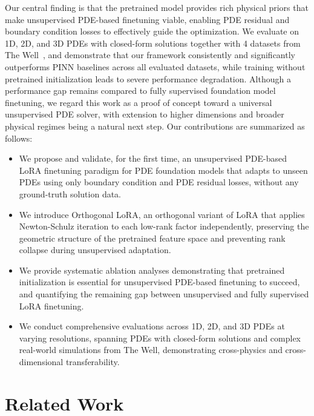 \documentclass{article}
\begin{document}
Our central finding is that the pretrained model provides rich physical priors that make unsupervised PDE-based finetuning viable, enabling PDE residual and boundary condition losses to effectively guide the optimization. We evaluate on 1D, 2D, and 3D PDEs with closed-form solutions together with 4 datasets from The Well~\cite{ohana2024thewell}, and demonstrate that our framework consistently and significantly outperforms PINN baselines across all evaluated datasets, while training without pretrained initialization leads to severe performance degradation. Although a performance gap remains compared to fully supervised foundation model finetuning, we regard this work as a proof of concept toward a universal unsupervised PDE solver, with extension to higher dimensions and broader physical regimes being a natural next step. Our contributions are summarized as follows:
\begin{itemize}
    \item We propose and validate, for the first time, an unsupervised PDE-based LoRA finetuning paradigm for PDE foundation models that adapts to unseen PDEs using only boundary condition and PDE residual losses, without any ground-truth solution data.
    \item We introduce Orthogonal LoRA, an orthogonal variant of LoRA that applies Newton-Schulz iteration to each low-rank factor independently, preserving the geometric structure of the pretrained feature space and preventing rank collapse during unsupervised adaptation.
    \item We provide systematic ablation analyses demonstrating that pretrained initialization is essential for unsupervised PDE-based finetuning to succeed, and quantifying the remaining gap between unsupervised and fully supervised LoRA finetuning.
    \item We conduct comprehensive evaluations across 1D, 2D, and 3D PDEs at varying resolutions, spanning PDEs with closed-form solutions and complex real-world simulations from The Well, demonstrating cross-physics and cross-dimensional transferability.
\end{itemize}



\section{Related Work}
\label{sec:related}
\end{document}
